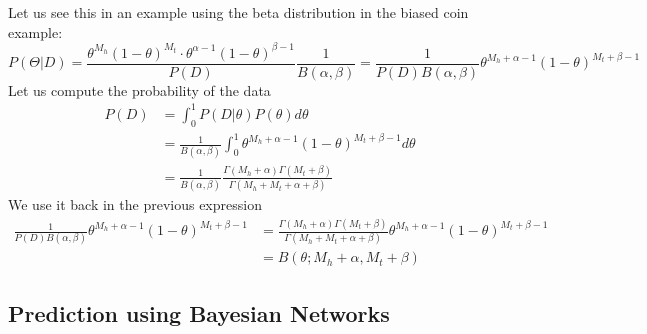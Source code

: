 Let us see this in an example using the beta distribution in the biased coin example:
\[
    P(\Theta|D) = \frac{\theta^{M_{h}}(1-\theta)^{M_{t}} \cdot \theta^{\alpha-1}(1-\theta)^{\beta - 1}}{P(D)} \frac{1}{B(\alpha,\beta)} = \frac{1}{P(D)B(\alpha,\beta)} \theta^{M_{h} + \alpha - 1}(1-\theta)^{M_{t}+\beta - 1}
\]
Let us compute the probability of the data
\begin{align*}
    P(D) & = \int_{0}^{1}P(D|\theta)P(\theta)d\theta                                                                       \\
         & = \frac{1}{B(\alpha,\beta)}\int_{0}^{1}\theta^{M_{h}+\alpha - 1}(1-\theta)^{M_{t}+\beta-1}d\theta               \\
         & = \frac{1}{B(\alpha,\beta)} \frac{\Gamma(M_{h}+\alpha) \Gamma(M_{t}+\beta)}{\Gamma(M_{h}+M_{t}+\alpha + \beta)}
\end{align*}
We use it back in the previous expression
\begin{align*}
    \frac{1}{P(D)B(\alpha,\beta)} \theta^{M_{h} + \alpha - 1}(1-\theta)^{M_{t}+\beta - 1} & =  \frac{\Gamma(M_{h}+\alpha) \Gamma(M_{t}+\beta)}{\Gamma(M_{h}+M_{t}+\alpha + \beta)}\theta^{M_{h} + \alpha - 1}(1-\theta)^{M_{t} + \beta - 1} \\
                                                                                          & = B(\theta; M_{h} + \alpha, M_{t} + \beta)
\end{align*}


\subsection{Prediction using Bayesian Networks}

